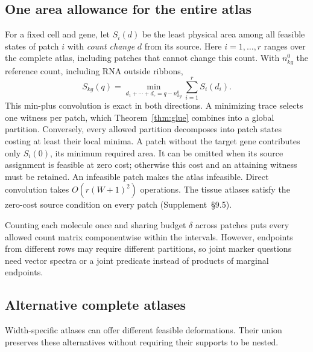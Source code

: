 \documentclass[10pt,letterpaper]{article}
\begin{document}
\subsection{One area allowance for the entire atlas}
For a fixed cell and gene, let $S_i(d)$ be the least physical area among all feasible states of patch $i$ with \emph{count change} $d$ from its source. Here $i=1,\ldots,r$ ranges over the complete atlas, including patches that cannot change this count. With $n^0_{kg}$ the reference count, including RNA outside ribbons,
\begin{equation}
S_{kg}(q)=\min_{d_1+\cdots+d_r=q-n^0_{kg}}\sum_{i=1}^r S_i(d_i).\label{eq:convolution}
\end{equation}
This min-plus convolution is exact in both directions. A minimizing trace selects one witness per patch, which Theorem~\ref{thm:glue} combines into a global partition. Conversely, every allowed partition decomposes into patch states costing at least their local minima. A patch without the target gene contributes only $S_i(0)$, its minimum required area. It can be omitted when its source assignment is feasible at zero cost; otherwise this cost and an attaining witness must be retained. An infeasible patch makes the atlas infeasible. Direct convolution takes $O(r(W+1)^2)$ operations. The tissue atlases satisfy the zero-cost source condition on every patch (Supplement~\S9.5).

Counting each molecule once and sharing budget $\delta$ across patches puts every allowed count matrix componentwise within the intervals. However, endpoints from different rows may require different partitions, so joint marker questions need vector spectra or a joint predicate instead of products of marginal endpoints.

\subsection{Alternative complete atlases}
Width-specific atlases can offer different feasible deformations. Their union preserves these alternatives without requiring their supports to be nested.
\end{document}
